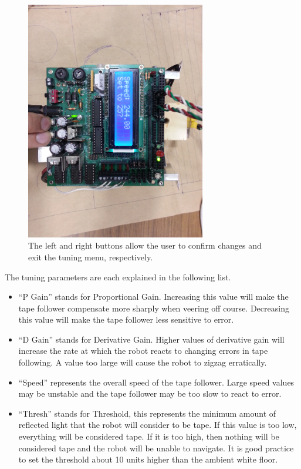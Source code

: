 \documentclass[11pt]{article}
\begin{document}
\begin{adjustwidth}{1cm}{}
	\begin{figure}[h]
	\centering
		\includegraphics[width=0.7\textwidth]{Figures/buttons.jpg}
		\caption{The left and right buttons allow the user to confirm changes and exit the tuning menu, respectively.}
	\end{figure}
	
	The tuning parameters are each explained in the following list.
	
	\begin{itemize}
	
		\item ``P Gain'' stands for Proportional Gain. Increasing this value will make the tape follower compensate more sharply when veering off course. Decreasing this value will make the tape follower less sensitive to error.
		
		\item ``D Gain'' stands for Derivative Gain. Higher values of derivative gain will increase the rate at which the robot reacts to changing errors in tape following. A value too large will cause the robot to zigzag erratically.
		
		\item ``Speed'' represents the overall speed of the tape follower. Large speed values may be unstable and the tape follower may be too slow to react to error.
		
		\item ``Thresh'' stands for Threshold, this represents the minimum amount of reflected light that the robot will consider to be tape. If this value is too low, everything will be considered tape. If it is too high, then nothing will be considered tape and the robot will be unable to navigate. It is good practice to set the threshold about 10 units higher than the ambient white floor.
	 

\end{itemize}
\end{adjustwidth}
\end{document}
